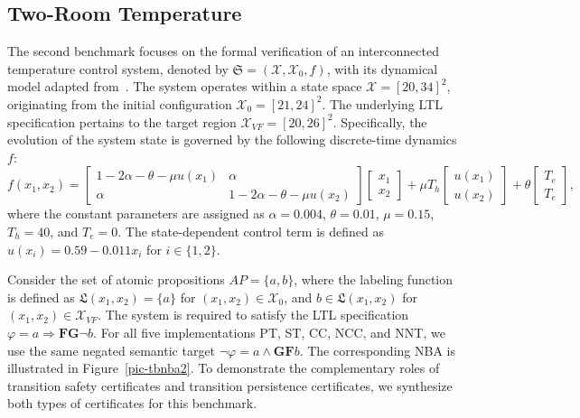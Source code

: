 \subsection{Two-Room Temperature}

The second benchmark focuses on the formal verification of an interconnected temperature control system, denoted by $\mathfrak{S} = (\mathcal{X}, \mathcal{X}_0, f)$, with its dynamical model adapted from~\cite{anand2024compositional}. The system operates within a state space $\mathcal{X} = [20, 34]^2$, originating from the initial configuration $\mathcal{X}_0 = [21, 24]^2$. The underlying LTL specification pertains to the target region $\mathcal{X}_{VF} = [20, 26]^2$. Specifically, the evolution of the system state is governed by the following discrete-time dynamics $f$:
\begin{equation}
f(x_1, x_2) = 
\begin{bmatrix} 1 - 2\alpha - \theta - \mu u(x_1) & \alpha \\ \alpha & 1 - 2\alpha - \theta - \mu u(x_2) \end{bmatrix}
\begin{bmatrix} x_1 \\ x_2 \end{bmatrix}
+ \mu T_h
\begin{bmatrix} u(x_1) \\ u(x_2) \end{bmatrix}
+ \theta
\begin{bmatrix} T_e \\ T_e \end{bmatrix},
\end{equation}
where the constant parameters are assigned as $\alpha = 0.004$, $\theta = 0.01$, $\mu = 0.15$, $T_h = 40$, and $T_e = 0$. The state-dependent control term is defined as $u(x_i) = 0.59 - 0.011 x_i$ for $i \in \{1, 2\}$.



Consider the set of atomic propositions $AP = \{a, b\}$, where the labeling function is defined as $\mathfrak{L}(x_1, x_2) = \{a\}$ for $(x_1, x_2) \in \mathcal{X}_0$, and $b \in \mathfrak{L}(x_1, x_2)$ for $(x_1, x_2) \in \mathcal{X}_{VF}$. The system is required to satisfy the LTL specification $\varphi = a \Rightarrow \mathbf{FG}\neg b$. For all five implementations PT, ST, CC, NCC, and NNT, we use the same negated semantic target $\neg \varphi = a \land \mathbf{GF} b$. The corresponding NBA is illustrated in Figure~\ref{pic-tbnba2}. To demonstrate the complementary roles of transition safety certificates and transition persistence certificates, we synthesize both types of certificates for this benchmark.


